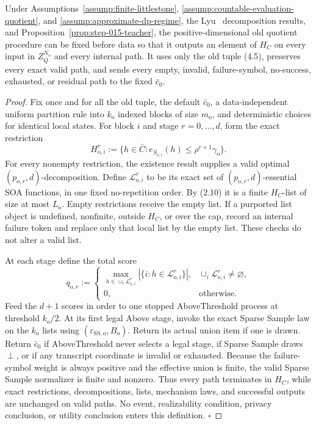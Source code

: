\begin{proposition}\label{prop:step-015-total}
Under Assumptions~\ref{assump:finite-littlestone},
\ref{assump:countable-evaluation-quotient}, and
\ref{assump:approximate-dp-regime}, the Lyu~\citep{lyu2025} decomposition results,
and Proposition~\ref{prop:step-015-teacher}, the positive-dimensional old
quotient procedure can be fixed before data so that it outputs an element
of \(H_C\) on every input in \(Z_Q^{N_{\mathrm o}}\) and every internal
path. It uses only the old tuple (4.5), preserves every exact valid
path, and sends every empty, invalid, failure-symbol, no-success, exhausted,
or residual path to the fixed \(\bar c_0\).


\end{proposition}

\begin{proof}
Fix once and for all the old tuple, the default \(\bar c_0\), a
data-independent uniform partition rule into \(k_{\mathrm o}\) indexed
blocks of size \(m_{\mathrm o}\), and deterministic choices for identical
local states. For block \(i\) and stage \(r=0,\ldots,d\), form the exact
restriction
\[
H_{\mathrm o,i}^r
:=\{h\in\bar C:
e_{\bar S_{\mathrm o,i}}(h)
\le\rho^{r+1}\gamma_{\mathrm o}\}.
\tag{5.1}
\]
For every nonempty restriction, the existence result supplies a
valid optimal \((p_{\mathrm o,r},d)\)-decomposition. Define
\(\mathcal L_{\mathrm o,i}^r\) to be its exact set of
\((p_{\mathrm o,r},d)\)-essential SOA functions, in one fixed
no-repetition order. By (2.10) it is a finite \(H_C\)-list of size at most
\(L_{\mathrm o}\). Empty restrictions receive the empty list. If a
  purported list object is undefined, nonfinite, outside \(H_C\), or over
the cap, record an internal failure token and replace only that local list
by the empty list. These checks do not alter a valid list.

At each stage define the total score
\[
q_{\mathrm o,r}:=
\begin{cases}
\displaystyle\max_{h\in\cup_i\mathcal L_{\mathrm o,i}^r}
|\{i:h\in\mathcal L_{\mathrm o,i}^r\}|,&
\cup_i\mathcal L_{\mathrm o,i}^r\ne\varnothing,\\
0,&\text{otherwise}.
\end{cases}
\tag{5.2}
\]
Feed the \(d+1\) scores in order to one stopped AboveThreshold process at
threshold \(k_{\mathrm o}/2\). At its first legal Above stage, invoke the
exact Sparse Sample law on the \(k_{\mathrm o}\) lists using
\((\varepsilon_{\mathrm{SS,o}},B_{\mathrm o})\). Return its actual union
item if one is drawn. Return \(\bar c_0\) if AboveThreshold never selects a
legal stage, if Sparse Sample draws \(\perp\), or if any transcript
coordinate is invalid or exhausted. Because the failure-symbol weight is
always positive and the effective union is finite, the valid Sparse
Sample normalizer is finite and nonzero. Thus every path terminates in
\(H_C\), while exact restrictions, decompositions, lists, mechanism laws,
and successful outputs are unchanged on valid paths. No event,
realizability condition, privacy conclusion, or utility conclusion enters
this definition. \(\square\)


\end{proof}

